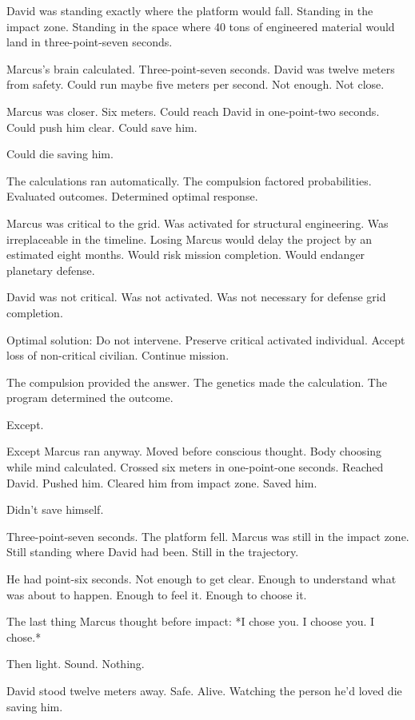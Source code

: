 David was standing exactly where the platform would fall. Standing in the impact zone. Standing in the space where 40 tons of engineered material would land in three-point-seven seconds.

Marcus's brain calculated. Three-point-seven seconds. David was twelve meters from safety. Could run maybe five meters per second. Not enough. Not close.

Marcus was closer. Six meters. Could reach David in one-point-two seconds. Could push him clear. Could save him.

Could die saving him.

The calculations ran automatically. The compulsion factored probabilities. Evaluated outcomes. Determined optimal response.

Marcus was critical to the grid. Was activated for structural engineering. Was irreplaceable in the timeline. Losing Marcus would delay the project by an estimated eight months. Would risk mission completion. Would endanger planetary defense.

David was not critical. Was not activated. Was not necessary for defense grid completion.

Optimal solution: Do not intervene. Preserve critical activated individual. Accept loss of non-critical civilian. Continue mission.

The compulsion provided the answer. The genetics made the calculation. The program determined the outcome.

Except.

Except Marcus ran anyway. Moved before conscious thought. Body choosing while mind calculated. Crossed six meters in one-point-one seconds. Reached David. Pushed him. Cleared him from impact zone. Saved him.

Didn't save himself.

Three-point-seven seconds. The platform fell. Marcus was still in the impact zone. Still standing where David had been. Still in the trajectory.

He had point-six seconds. Not enough to get clear. Enough to understand what was about to happen. Enough to feel it. Enough to choose it.

The last thing Marcus thought before impact: *I chose you. I choose you. I chose.*

Then light. Sound. Nothing.

\scenebreak

David stood twelve meters away. Safe. Alive. Watching the person he'd loved die saving him.

